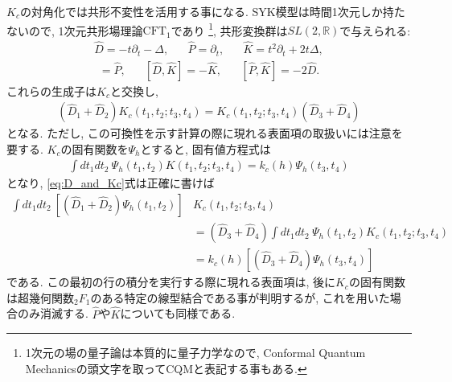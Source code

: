 $K_c$の対角化では共形不変性を活用する事になる. 
SYK模型は時間1次元しか持たないので, 1次元共形場理論$\mathrm{CFT}_1$であり
\footnote{1次元の場の量子論は本質的に量子力学なので, 
Conformal Quantum Mechanicsの頭文字を取ってCQMと表記する事もある. }, 
共形変換群は$SL(2, \mathbb{R})$で与えられる\cite{andrzejewski}:
\begin{align}
	\hat{D} = -t\partial_t - \Delta,\hspace{20pt}
	\hat{P} = \partial_t,\hspace{20pt}
	\hat{K} = t^2\partial_t + 2t\Delta,
\end{align}
\begin{align}
	[\hat{D}, \hat{P}] = \hat{P},\hspace{20pt}
	[\hat{D}, \hat{K}] = -\hat{K},\hspace{20pt}
	[\hat{P}, \hat{K}] = -2\hat{D}.
\end{align}
これらの生成子は$K_c$と交換し, 
\begin{align}
	(\hat{D}_1 + \hat{D}_2)K_c(t_1, t_2; t_3, t_4)
	= K_c(t_1, t_2; t_3, t_4)(\hat{D}_3 + \hat{D}_4)
	\label{eq:D_and_Kc}
\end{align}
となる. 
ただし, この可換性を示す計算の際に現れる表面項の取扱いには注意を要する. 
$K_c$の固有関数を$\Psi_h$とすると, 固有値方程式は
\begin{align}
	\int dt_1dt_2\ \Psi_h(t_1, t_2) K(t_1, t_2; t_3, t_4)
	= k_c(h)\Psi_h(t_3, t_4)
	\label{eq:eigen_eq_of_Kc}
\end{align}
となり, \eqref{eq:D_and_Kc}式は正確に書けば
\begin{align}
	\int dt_1 dt_2\ \left[(\hat{D}_1 + \hat{D}_2)\Psi_h(t_1, t_2)\right]
	&K_c(t_1, t_2; t_3, t_4)\nonumber\\
	&= (\hat{D}_3 + \hat{D}_4)\int dt_1dt_2\ \Psi_h(t_1, t_2) K_c(t_1, t_2; t_3, t_4)
	\nonumber\\
	&= k_c(h)\left[(\hat{D}_3 + \hat{D}_4)\Psi_h(t_3, t_4)\right]
\end{align}
である. この最初の行の積分を実行する際に現れる表面項は, 
後に$K_c$の固有関数は超幾何関数${}_2F_1$のある特定の線型結合である事が判明するが, 
これを用いた場合のみ消滅する. 
$\hat{P}$や$\hat{K}$についても同様である. 

